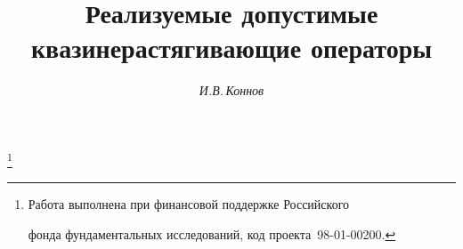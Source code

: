




\newcommand{\conv}{\operatorname{conv}}




\newcommand{\tts}[1]{}







 


\setcounter{page}{32}















\author{\it И.В.\,Коннов}




\title{Реализуемые допустимые\\


квазинерастягивающие операторы}


\thanks{Работа выполнена при финансовой поддержке Российского


фонда фундаментальных исследований, код проекта \No\,98-01-00200.}





\date{}




\pagestyle{plain} %







\maketitle


